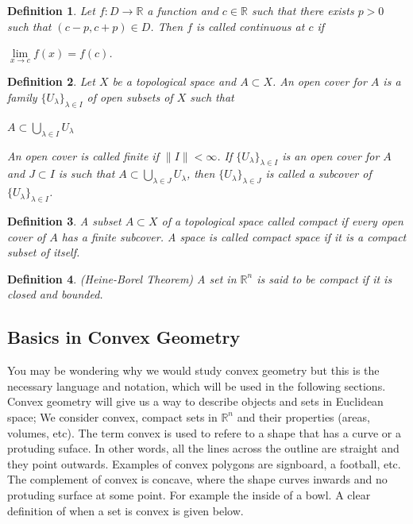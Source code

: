 \documentclass[a4paper]{book}
\newtheorem{definition}{Definition}%
\begin{document}
\begin{definition}
	Let $f:D\to\mathbb{R}$ a function and $c\in\mathbb{R}$ such that there exists $p>0$ such that $(c-p,c+p)\in D$. Then $f$ is called \textit{continuous} at $c$ if
	\begin{center}
		$\underset{x\to c}{\lim}f(x)=f(c)$.
	\end{center}
\end{definition}

\begin{definition}
    Let $X$ be a topological space and $A \subset X$. An open cover for $A$ is a family $\{U_\lambda\}_{\lambda\in I}$ of open subsets of $X$ such that
    \begin{center}
        $A \subset\underset{\lambda\in I}{\bigcup}{U_\lambda}$
    \end{center}
    An open cover is called finite if $\|I\|<\infty$. If $\{U_\lambda\}_{\lambda\in I}$ is an open cover for $A$ and $J \subset I$ is such that $A\subset\underset{\lambda\in J}{\bigcup}{U_\lambda}$, then $\{U_\lambda\}_{\lambda\in J}$ is called a subcover of $\{U_\lambda\}_{\lambda\in I}$.
\end{definition}

\begin{definition}
    A subset $A \subset X$ of a topological space called compact if every open cover of $A$ has a finite subcover. A space is called compact space if it is a compact subset of itself.
\end{definition}

\begin{definition} (Heine-Borel Theorem)
    A set in $\mathbb{R}^n$ is said to be compact if it is closed and bounded.
\end{definition}

\newpage
\subsection{Basics in Convex Geometry}
You may be wondering why we would study convex geometry but this is the necessary language and notation, which will be used in the following sections. Convex geometry will give us a way to describe objects and sets in Euclidean space; We consider convex, compact sets in $\mathbb{R}^n$ and their properties (areas, volumes, etc). The term convex is used to refere to a shape that has a curve or a protuding suface. In other words, all the lines across the outline are straight and they point outwards. Examples of convex polygons are signboard, a football, etc. The complement of convex is concave, where the shape curves inwards and no protuding surface at some point. For example the inside of a bowl. A clear definition of when a set is convex is given below. 
\end{document}
